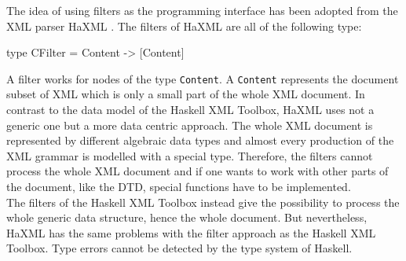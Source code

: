 \documentclass[11pt,a4paper,headsepline, bibtotoc]{scrreprt}
\begin{document}
The idea of using filters as the programming interface has been adopted from the XML parser HaXML \cite{HaXML}. The filters of HaXML are all of the following type:
\begin{code}
type CFilter = Content -> [Content]
\end{code}
A filter works for nodes of the type \texttt{Content}. A \texttt{Content} represents the document subset of XML which is only a small part of the whole XML document. In contrast to the data model of the Haskell XML Toolbox, HaXML uses not a generic one but a more data centric approach. The whole XML document is represented by different algebraic data types and almost every production of the XML grammar is modelled with a special type. Therefore, the filters cannot process the whole XML document and if one wants to work with other parts of the document, like the DTD, special functions have to be implemented.\\
The filters of the Haskell XML Toolbox instead give the possibility to process the whole generic data structure, hence the whole document. But nevertheless, HaXML has the same problems with the filter approach as the Haskell XML Toolbox. Type errors cannot be detected by the type system of Haskell. 
\end{document}

